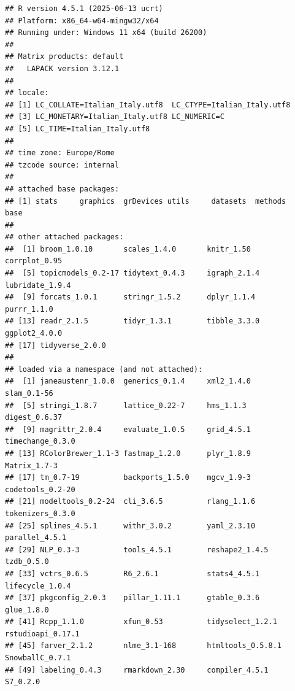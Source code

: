 \documentclass[
]{article}
\begin{document}
\begin{verbatim}
## R version 4.5.1 (2025-06-13 ucrt)
## Platform: x86_64-w64-mingw32/x64
## Running under: Windows 11 x64 (build 26200)
## 
## Matrix products: default
##   LAPACK version 3.12.1
## 
## locale:
## [1] LC_COLLATE=Italian_Italy.utf8  LC_CTYPE=Italian_Italy.utf8   
## [3] LC_MONETARY=Italian_Italy.utf8 LC_NUMERIC=C                  
## [5] LC_TIME=Italian_Italy.utf8    
## 
## time zone: Europe/Rome
## tzcode source: internal
## 
## attached base packages:
## [1] stats     graphics  grDevices utils     datasets  methods   base     
## 
## other attached packages:
##  [1] broom_1.0.10       scales_1.4.0       knitr_1.50         corrplot_0.95     
##  [5] topicmodels_0.2-17 tidytext_0.4.3     igraph_2.1.4       lubridate_1.9.4   
##  [9] forcats_1.0.1      stringr_1.5.2      dplyr_1.1.4        purrr_1.1.0       
## [13] readr_2.1.5        tidyr_1.3.1        tibble_3.3.0       ggplot2_4.0.0     
## [17] tidyverse_2.0.0   
## 
## loaded via a namespace (and not attached):
##  [1] janeaustenr_1.0.0  generics_0.1.4     xml2_1.4.0         slam_0.1-56       
##  [5] stringi_1.8.7      lattice_0.22-7     hms_1.1.3          digest_0.6.37     
##  [9] magrittr_2.0.4     evaluate_1.0.5     grid_4.5.1         timechange_0.3.0  
## [13] RColorBrewer_1.1-3 fastmap_1.2.0      plyr_1.8.9         Matrix_1.7-3      
## [17] tm_0.7-19          backports_1.5.0    mgcv_1.9-3         codetools_0.2-20  
## [21] modeltools_0.2-24  cli_3.6.5          rlang_1.1.6        tokenizers_0.3.0  
## [25] splines_4.5.1      withr_3.0.2        yaml_2.3.10        parallel_4.5.1    
## [29] NLP_0.3-3          tools_4.5.1        reshape2_1.4.5     tzdb_0.5.0        
## [33] vctrs_0.6.5        R6_2.6.1           stats4_4.5.1       lifecycle_1.0.4   
## [37] pkgconfig_2.0.3    pillar_1.11.1      gtable_0.3.6       glue_1.8.0        
## [41] Rcpp_1.1.0         xfun_0.53          tidyselect_1.2.1   rstudioapi_0.17.1 
## [45] farver_2.1.2       nlme_3.1-168       htmltools_0.5.8.1  SnowballC_0.7.1   
## [49] labeling_0.4.3     rmarkdown_2.30     compiler_4.5.1     S7_0.2.0
\end{verbatim}
\end{document}
